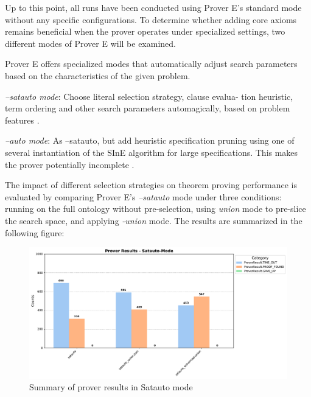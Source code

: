 \documentclass[english,version-2020-11]{uzl-thesis}
\begin{document}
Up to this point, all runs have been conducted using Prover E's standard mode without any specific configurations. To determine whether adding core axioms remains beneficial when the prover operates under specialized settings, two different modes of Prover E will be examined.

Prover E offers specialized modes that automatically adjust search parameters based on the characteristics of the given problem.

\begin{definition}
    \textit{--satauto mode}: Choose literal selection strategy, clause evalua-
    tion heuristic, term ordering and other search
    parameters automagically, based on problem features \cite{schulz2019eprover}.
\end{definition}

\begin{definition}
    \textit{--auto mode}: As --satauto, but add heuristic specification
    pruning using one of several instantiation of the
    SInE algorithm for large specifications.
    This makes the prover potentially incomplete \cite{schulz2019eprover}.
\end{definition}


The impact of different selection strategies on theorem proving performance is evaluated by comparing Prover E's \textit{--satauto} mode under three conditions: running on the full ontology without pre-selection, using \textit{union} mode to pre-slice the search space, and applying \textit{-union} mode. The results are summarized in the following figure:

\begin{figure}[h!]
    \centering
    \includegraphics[width=\textwidth]{satauto_mode_output.pdf}
    \caption{Summary of prover results in Satauto mode}
    \label{fig:prover_results_satauto}
\end{figure}
\FloatBarrier
\end{document}
